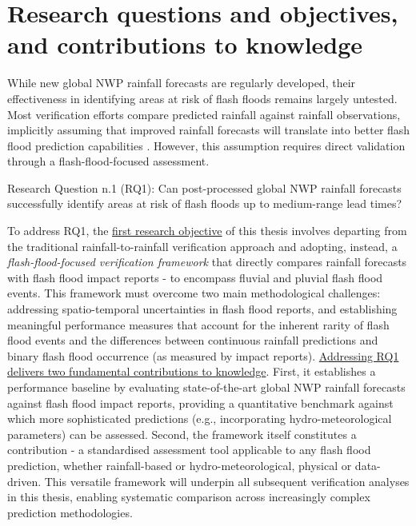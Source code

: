 \section{Research questions and objectives, and contributions to knowledge}
\label{general_introduction_research_questions_objectives_contribution2knowledge}

While  new global NWP rainfall forecasts are regularly developed, their effectiveness in identifying areas at risk of flash floods remains largely untested. Most verification efforts compare predicted rainfall against rainfall observations, implicitly assuming that improved rainfall forecasts will translate into better flash flood prediction capabilities \citep{Gascón_2024}. However, this assumption requires direct validation through a flash-flood-focused assessment. 

\begin{tcolorbox}[
  colframe=colour_chapter5,  
  colback=white,           
  sharp corners,        
  boxrule=2mm,          
  left=0mm,             
  right=0mm,            
  toprule=0mm,          
  bottomrule=0mm,       
  rightrule=2mm        
]
{\color{colour_chapter5} {\setlength{\parindent}{1.0em} Research Question n.1 (RQ1): Can post-processed global NWP rainfall forecasts successfully identify areas at risk of flash floods up to medium-range lead times?}}
\end{tcolorbox}

\noindent To address RQ1, the \uline{first research objective} of this thesis involves departing from the traditional rainfall-to-rainfall verification approach and adopting, instead, a \textit{flash-flood-focused verification framework} that directly compares rainfall forecasts with flash flood impact reports - to encompass fluvial and pluvial flash flood events. This framework must overcome two main methodological challenges: addressing spatio-temporal uncertainties in flash flood reports, and establishing meaningful performance measures that account for the inherent rarity of flash flood events and the differences between continuous rainfall predictions and binary flash flood occurrence (as measured by impact reports). \uline{Addressing RQ1 delivers two fundamental contributions to knowledge}. First, it establishes a performance baseline by evaluating state-of-the-art global NWP rainfall forecasts against flash flood impact reports, providing a quantitative benchmark against which more sophisticated predictions (e.g., incorporating hydro-meteorological parameters) can be assessed. Second, the framework itself constitutes a contribution - a standardised assessment tool applicable to any flash flood prediction, whether rainfall-based or hydro-meteorological, physical or data-driven. This versatile framework will underpin all subsequent verification analyses in this thesis, enabling systematic comparison across increasingly complex prediction methodologies.


